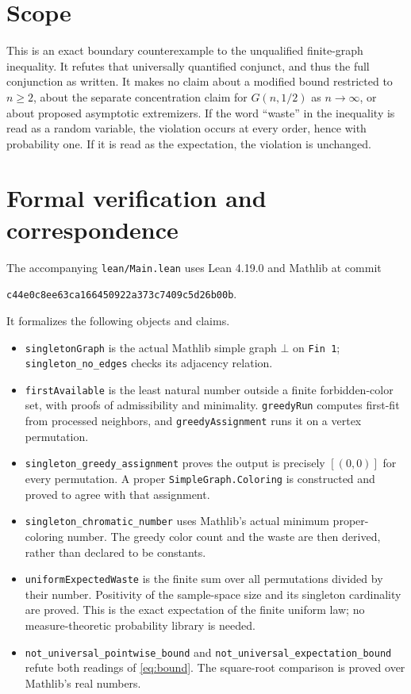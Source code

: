 \documentclass[11pt]{article}
\begin{document}
\section*{Scope}
This is an exact boundary counterexample to the unqualified finite-graph inequality. It refutes that universally quantified conjunct, and thus the full conjunction as written. It makes no claim about a modified bound restricted to $n\geq2$, about the separate concentration claim for $G(n,1/2)$ as $n\to\infty$, or about proposed asymptotic extremizers. If the word ``waste'' in the inequality is read as a random variable, the violation occurs at every order, hence with probability one. If it is read as the expectation, the violation is unchanged.

\section*{Formal verification and correspondence}
The accompanying \texttt{lean/Main.lean} uses Lean 4.19.0 and Mathlib at commit
\begin{center}\small\texttt{c44e0c8ee63ca166450922a373c7409c5d26b00b}.\end{center}
It formalizes the following objects and claims.
\begin{itemize}
\item \texttt{singletonGraph} is the actual Mathlib simple graph $\bot$ on \texttt{Fin 1}; \texttt{singleton\_no\_edges} checks its adjacency relation.
\item \texttt{firstAvailable} is the least natural number outside a finite forbidden-color set, with proofs of admissibility and minimality. \texttt{greedyRun} computes first-fit from processed neighbors, and \texttt{greedyAssignment} runs it on a vertex permutation.
\item \texttt{singleton\_greedy\_assignment} proves the output is precisely $[(0,0)]$ for every permutation. A proper \texttt{SimpleGraph.Coloring} is constructed and proved to agree with that assignment.
\item \texttt{singleton\_chromatic\_number} uses Mathlib's actual minimum proper-coloring number. The greedy color count and the waste are then derived, rather than declared to be constants.
\item \texttt{uniformExpectedWaste} is the finite sum over all permutations divided by their number. Positivity of the sample-space size and its singleton cardinality are proved. This is the exact expectation of the finite uniform law; no measure-theoretic probability library is needed.
\item \texttt{not\_universal\_pointwise\_bound} and \texttt{not\_universal\_expectation\_bound} refute both readings of \eqref{eq:bound}. The square-root comparison is proved over Mathlib's real numbers.
\end{itemize}
\end{document}
